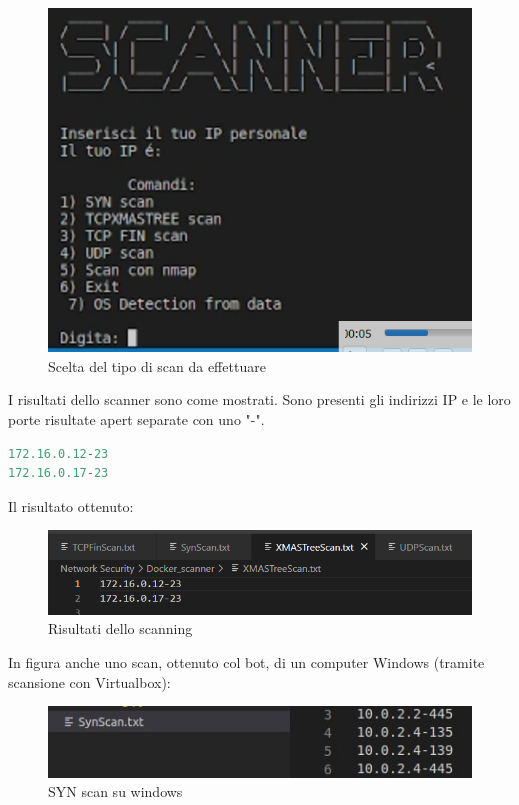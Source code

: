 \begin{figure}[H]
    \centering
    \includegraphics[scale=0.5]{UNINA_MSc_Thesis_Project/img/Esecuzione/ScanningChoice.png}
    \caption{Scelta del tipo di scan da effettuare}
    \label{fig:my_label}
\end{figure}

I risultati dello scanner sono come mostrati. Sono presenti gli indirizzi IP e le loro porte risultate apert separate con uno "-".

\begin{lstlisting}[language=Python]
172.16.0.12-23
172.16.0.17-23
\end{lstlisting}

Il risultato ottenuto:

\begin{figure}[H]
    \centering
    \includegraphics{UNINA_MSc_Thesis_Project/img/Esecuzione/scannerResults.png}
    \caption{Risultati dello scanning}
    \label{fig:my_label}
\end{figure}

In figura anche uno scan, ottenuto col bot, di un computer Windows (tramite scansione con Virtualbox):
\begin{figure}[H]
    \centering
    \includegraphics[scale=0.6]{UNINA_MSc_Thesis_Project/img/Esecuzione/SynScan Windows.jpg}
    \caption{SYN scan su windows}
    \label{fig:my_label}
\end{figure}

